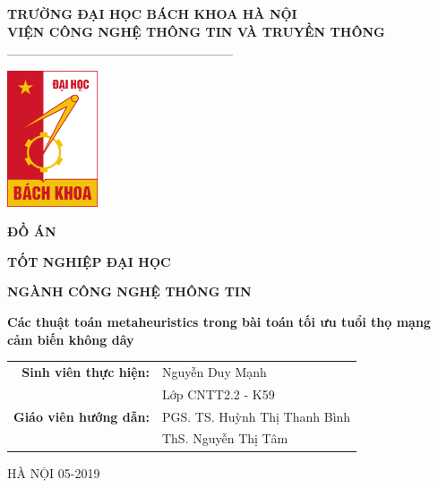 
\begin{titlepage}

    \begin{center}

        \textbf{TRƯỜNG ĐẠI HỌC BÁCH KHOA HÀ NỘI}\\
        \textbf{VIỆN CÔNG NGHỆ THÔNG TIN VÀ TRUYỀN THÔNG}\\
        \_\_\_\_\_\_\_\_\_\_\_\_\_\_\_\_\_\_\_\_\_\_\_\_\
        \vspace*{1cm}

        \includegraphics[width=0.2\textwidth]{picture/bklogo.jpg}
        \vspace*{1cm}
  
        \LARGE
        \textbf{ĐỒ ÁN}

        \Huge
        \textbf{TỐT NGHIỆP ĐẠI HỌC}
        
        \large
        \textbf{NGÀNH CÔNG NGHỆ THÔNG TIN}
        
        
        \vspace{1cm}
        \large
        \textbf{Các thuật toán metaheuristics trong bài toán tối ưu tuổi thọ mạng cảm biến không dây}
  
        \vspace{1.5cm}
  
        \begin{table}[H]
            \raggedleft
            \begin{tabular}{rl}
            \textbf{Sinh viên thực hiện:} & Nguyễn Duy Mạnh               \\
                                 & Lớp CNTT2.2 - K59             \\
            \textbf{Giáo viên hướng dẫn:} & PGS. TS. Huỳnh Thị Thanh Bình \\
                                 & ThS. Nguyễn Thị Tâm          
            \end{tabular}
        \end{table}
  
        \vfill
  
        
  
        \vspace{0.8cm}
  
       
  
        
        HÀ NỘI 05-2019
  
    \end{center}
\end{titlepage}

